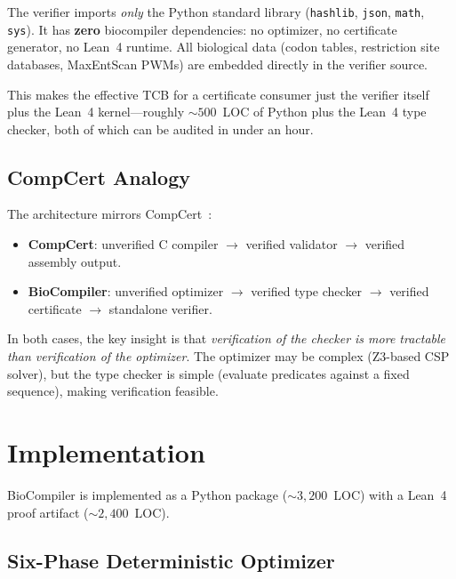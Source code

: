 \documentclass[runningheads]{llncs}
\begin{document}
The verifier imports \emph{only} the Python standard library
(\texttt{hashlib}, \texttt{json}, \texttt{math}, \texttt{sys}).
It has \textbf{zero} biocompiler dependencies: no optimizer, no
certificate generator, no Lean~4 runtime.
All biological data (codon tables, restriction site databases,
MaxEntScan PWMs) are embedded directly in the verifier source.

This makes the effective TCB for a certificate consumer just the
verifier itself plus the Lean~4 kernel---roughly ${\sim}500$~LOC of
Python plus the Lean~4 type checker, both of which can be audited in
under an hour.

\subsection{CompCert Analogy}

The architecture mirrors CompCert~\cite{leroy2009compcert}:
\begin{itemize}[leftmargin=*,itemsep=0pt,topsep=1pt]
\item \textbf{CompCert}: unverified C compiler $\to$ verified
      validator $\to$ verified assembly output.
\item \textbf{BioCompiler}: unverified optimizer $\to$ verified type
      checker $\to$ verified certificate $\to$ standalone verifier.
\end{itemize}
In both cases, the key insight is that \emph{verification of the
checker is more tractable than verification of the optimizer}.
The optimizer may be complex (Z3-based CSP solver), but the type
checker is simple (evaluate predicates against a fixed sequence),
making verification feasible.

\section{Implementation}\label{sec:impl}

BioCompiler is implemented as a Python package (${\sim}3{,}200$~LOC)
with a Lean~4 proof artifact (${\sim}2{,}400$~LOC).

\subsection{Six-Phase Deterministic Optimizer}
\end{document}

